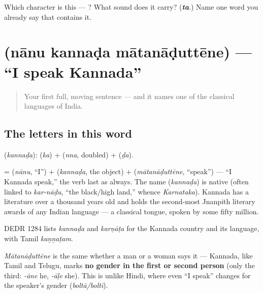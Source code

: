 \begin{tcolorbox}[breakable,colback=teal!4,colframe=teal!35!black,title={Before you move on}]
Which character is this — ? What sound does it carry? (\emph{\textbf{ta}}.) Name one word you already say that contains it.
\end{tcolorbox}
\section[\texorpdfstring{\kn{ನಾನು} \kn{ಕನ್ನಡ} … (nānu kannaḍa …)}{ನಾನು ಕನ್ನಡ … (nānu kannaḍa …)}]{   (nānu kannaḍa mātanāḍuttēne) — \textquotedblleft{}I speak Kannada\textquotedblright{}}

\label{lesson:KA-C05-naanu-kannada-maatanaaduttene}



\begin{quote}
Your first full, moving sentence — and it names one of the classical languages of India.
\end{quote}

\subsection*{The letters in this word}
\textbf{} (\emph{kannaḍa}): \textbf{} (\emph{ka}) + \textbf{} (\emph{nna}, doubled) + \textbf{} (\emph{ḍa}).

\begin{cousinweb}
\textbf{  } = \textbf{} (\emph{nānu}, \textquotedblleft{}I\textquotedblright{}) + \textbf{} (\emph{kannaḍa}, the object) + \textbf{} (\emph{mātanāḍuttēne}, \textquotedblleft{}speak\textquotedblright{}) — \textquotedblleft{}I Kannada speak,\textquotedblright{} the verb last as always. The name \textbf{} (\emph{kannaḍa}) is native (often linked to \emph{kar-nāḍu}, \textquotedblleft{}the black/high land,\textquotedblright{} whence \emph{Karnataka}). Kannada has a literature over a thousand years old and holds the second-most Jnanpith literary awards of any Indian language — a classical tongue, spoken by some fifty million.

DEDR 1284 lists \emph{kannaḍa} and \emph{karṇāṭa} for the Kannada country and its language, with Tamil \emph{kaṉṉaṭam}.
\end{cousinweb}

\begin{grammarlens}[title={Grammar Lens: no gender on \textquotedblleft{}I speak\textquotedblright{}}]
\emph{Mātanāḍuttēne} is the same whether a man or a woman says it — Kannada, like Tamil and Telugu, marks \textbf{no gender in the first or second person} (only the third: \emph{-āne} he, \emph{-āḷe} she). This is unlike Hindi, where even \textquotedblleft{}I speak\textquotedblright{} changes for the speaker's gender (\emph{boltā/boltī}).
\end{grammarlens}

